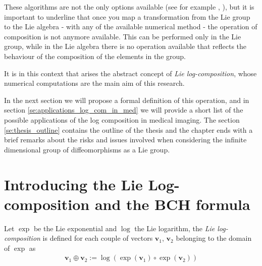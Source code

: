 These algorithms are not the only options available (see for example \cite{bossa2008algorithms}, \cite{bossa2008new}), but it is important to underline that once you map a transformation from the Lie group to the Lie algebra - with any of the available numerical method - the operation of composition is not anymore available. This can be performed only in the Lie group, while in the Lie algebra there is no operation available that reflects the behaviour of the composition of the elements in the group.

It is in this context that arises the abstract concept of \emph{Lie log-composition}, whose numerical computations are the main aim of this research.

In the next section we will propose a formal definition of this operation, and in section \ref{se:applications_log_com_in_med} we will provide a short list of the possible applications of the log composition in medical imaging. 
The section \ref{se:thesis_outline} contains the outline of the thesis and the chapter ends with 
a brief remarks about the risks and issues involved when considering the infinite dimensional group of diffeomorphisms as a Lie group. 

\section{Introducing the Lie Log-composition and the BCH formula}\label{se:introducing_log_composition}

% 
Let $\exp$ be the Lie exponential  and $\log$ the Lie logarithm, the \emph{Lie log-composition} is defined for each couple of vectors $\mathbf{v}_1$, $\mathbf{v}_2$ belonging to the domain of $\exp$ as
\begin{align}\label{eq:bch_problem}
\mathbf{v}_1 \oplus \mathbf{v}_2 := \log(\exp(\mathbf{v}_1)\circ\exp(\mathbf{v}_2))
\end{align}


